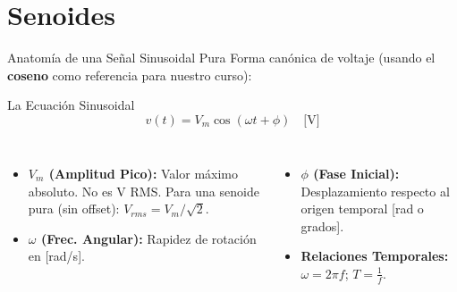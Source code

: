 \documentclass[aspectratio=169, 10pt]{beamer}
\begin{document}
\section{Senoides}
\begin{frame}{Anatomía de una Señal Sinusoidal Pura}
    Forma canónica de voltaje (usando el \textbf{coseno} como referencia para nuestro curso):
    \begin{alertblock}{La Ecuación Sinusoidal}
        $$ v(t) = V_m \cos(\omega t + \phi) \quad \text{[V]} $$
    \end{alertblock}
    
    \begin{columns}
        \begin{itemize}
            \item \textbf{$V_m$ (Amplitud Pico):} Valor máximo absoluto. No es V RMS. Para una senoide pura (sin offset): $V_{rms} = V_m / \sqrt{2}$.
            \item \textbf{$\omega$ (Frec. Angular):} Rapidez de rotación en [rad/s].
        \end{itemize}
        \begin{itemize}
            \item \textbf{$\phi$ (Fase Inicial):} Desplazamiento respecto al origen temporal [rad o grados].
            \item \textbf{Relaciones Temporales:} $\omega = 2\pi f$; $T = \frac{1}{f}$.
        \end{itemize}
    \end{columns}
\end{frame}
\end{document}
